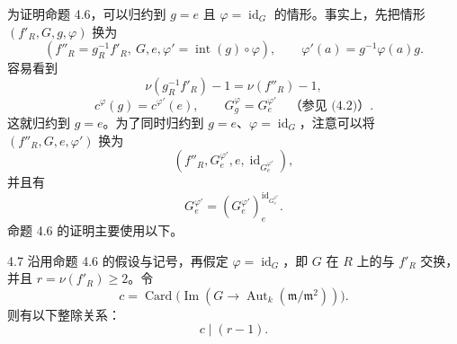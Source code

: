为证明命题 4.6，可以归约到 $g=e$ 且 $\varphi=\operatorname{id}_G$ 的情形。事实上，先把情形 $(f'_R,G,g,\varphi)$ 换为
\[
(f''_R=g_R^{-1}f'_R,\ G,e,\varphi'=\operatorname{int}(g)\circ\varphi),
\qquad\varphi'(a)=g^{-1}\varphi(a)g.
\]
容易看到
\[
\nu(g_R^{-1}f'_R)-1=\nu(f''_R)-1,
\]
\[
c^\varphi(g)=c^{\varphi'}(e),\qquad G_g^\varphi=G_e^{\varphi'}
\quad\text{（参见 (4.2)）}.
\]
这就归约到 $g=e$。为了同时归约到 $g=e$、$\varphi=\operatorname{id}_G$，注意可以将
$(f''_R,G,e,\varphi')$ 换为
\[
(f''_R,G_e^{\varphi'},e,\operatorname{id}_{G_e^{\varphi'}}),
\]
并且有
\[
G_e^{\varphi'}=(G_e^{\varphi'})_e^{\operatorname{id}_{G_e^{\varphi'}}}.
\]
命题 4.6 的证明主要使用以下。

\begin{SGAresult}{}{4.7}
沿用命题 4.6 的假设与记号，再假定 $\varphi=\operatorname{id}_G$，即 $G$ 在 $R$ 上的与 $f'_R$ 交换，并且 $r=\nu(f'_R)\geq2$。令
\[
c=\operatorname{Card}\bigl(\operatorname{Im}
 (G\longrightarrow\operatorname{Aut}_k(\mathfrak m/\mathfrak m^2))\bigr).
\]
则有以下整除关系：
\[
c\mid(r-1).
\]
\end{SGAresult}
